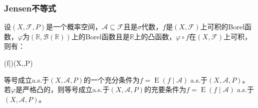 \subsubsection{Jensen不等式}
\begin{theorem}
	设$(X,\mathscr{F},P)$是一个概率空间，$\mathscr{A}\subseteq\mathscr{F}$且是$\sigma$代数，$f$是$(X,\mathscr{F})$上可积的Borel函数，$\varphi$为$(\mathbb{R},\mathcal{B}(\mathbb{R}))$上的Borel函数且是$\mathbb{R}$上的凸函数，$\varphi\circ f$在$(X,\mathscr{F})$上可积，则有：
	\begin{inequality*}\label{ineq:Jensen}
		\leqslant{}(\varphi\circ f|)\;(X,,P)
	\end{inequality*}
	等号成立a.s.于$(X,\mathscr{A},P)$的一个充分条件为$f=\operatorname{E}(f\mid\mathscr{A})\;$a.s.于$(X,\mathscr{A},P)$。若$\varphi$是严格凸的，则等号成立a.s.于$(X,\mathscr{A},P)$的充要条件为$f=\operatorname{E}(f\mid\mathscr{A})\;$a.s.于$(X,\mathscr{A},P)$。
\end{theorem}
